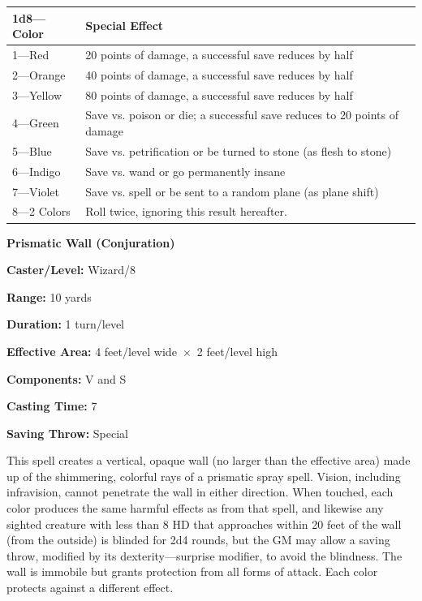 \begin{multicols}{2}
\noindent
\begin{tabular}{|p{}|p{}|}
\hline
1d8---Color	& Special Effect \\
\hline\hline
\rowcolor[gray]{0.9}1---Red	& 20 points of damage, a successful save reduces by half \\
2---Orange	& 40 points of damage, a successful save reduces by half \\
\rowcolor[gray]{0.9}3---Yellow	& 80 points of damage, a successful save reduces by half \\
4---Green	& Save vs. poison or die; a successful save reduces to 20 points of damage \\
\rowcolor[gray]{0.9}5---Blue	& Save vs. petrification or be turned to stone (as flesh to stone) \\
6---Indigo	& Save vs. wand or go permanently insane  \\
\rowcolor[gray]{0.9}7---Violet	& Save vs. spell or be sent to a random plane (as plane shift) \\
8---2 Colors	& Roll twice, ignoring this result hereafter. \\
\hline
\end{tabular}

\vspace{1em}

\noindent
\begin{minipage}{\columnwidth}

\noindent \textbf{Prismatic Wall (Conjuration)}

\noindent \textbf{Caster/Level:} Wizard/8

\noindent \textbf{Range:} 10 yards

\noindent \textbf{Duration:} 1 turn/level

\noindent \textbf{Effective Area:} 4 feet/level wide~$\times$~2 feet/level high

\noindent \textbf{Components:} V and S

\noindent \textbf{Casting Time:} 7

\noindent \textbf{Saving Throw:} Special

\end{minipage}

This spell creates a vertical, opaque wall (no larger than the effective area) made up of the shimmering, colorful rays of a prismatic spray spell.  Vision, including infravision, cannot penetrate the wall in either direction.  When touched, each color produces the same harmful effects as from that spell, and likewise any sighted creature with less than 8 HD that approaches within 20 feet of the wall (from the outside) is blinded for 2d4 rounds, but the GM may allow a saving throw, modified by its dexterity---surprise modifier, to avoid the blindness.  The wall is immobile but grants protection from all forms of attack.  Each color protects against a different effect.


\end{multicols}
